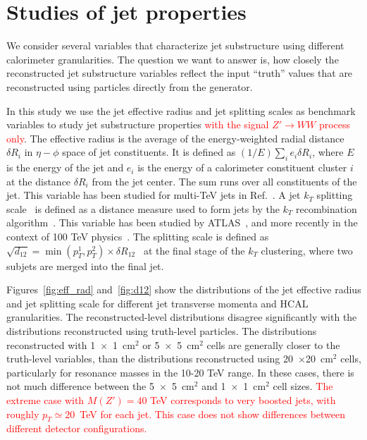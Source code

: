 \section{Studies of jet properties}
\label{sec:jets}

We consider several variables that characterize jet substructure using different calorimeter granularities. The question we want to answer is, how closely the reconstructed
jet substructure variables reflect the input ``truth'' values  that are reconstructed using particles directly from the \pythia generator.

In this study we use the jet effective radius and jet splitting scales as benchmark variables
to study jet substructure properties \textcolor{red}{with the signal $Z'\rightarrow WW$ process only}. 
The effective radius is the average of the energy-weighted radial distance $\delta R_i$ in $\eta-\phi$ space of jet constituents.
It is defined as $(1/E) \sum_i e_i \delta R_i$, where $E$ is the energy of the jet and $e_i$ is the energy of a calorimeter 
constituent cluster $i$ at the distance $\delta R_i$ from the jet center. The sum runs over all constituents of the jet. 
This variable has been studied for multi-TeV jets in Ref.~\cite{Auerbach:2014xua}.
A jet $k_T$ splitting scale~\cite{Butterworth:2002tt} is defined as a distance measure
used to form jets by the $k_T$ recombination
algorithm~\cite{Catani1993187,Ellis:1993tq}.
This variable has been studied by ATLAS~\cite{ATLAS:2012am}, and more recently in the context of 100 TeV physics~\cite{Auerbach:2014xua}.
The splitting scale is defined as $\sqrt{d_{12}}=\min(p_T^1,p_T^2) \times \delta R_{12}$~\cite{ATLAS:2012am} 
 at the final stage of the $k_T$ clustering, where two subjets are merged into the final jet.

Figures~\ref{fig:eff_rad} and~\ref{fig:d12} show the distributions of 
the jet effective radius and jet splitting scale for  different jet transverse momenta and HCAL granularities. 
The reconstructed-level distributions  disagree significantly with the distributions  
reconstructed using truth-level particles. The distributions reconstructed with 1~$\times$~1~cm$^2$ or 5~$\times$~5~cm$^2$ cells 
 are generally closer to the truth-level variables, than the distributions 
reconstructed using 20~$\times$20~cm$^2$ cells, particularly for resonance masses in the 10-20 TeV range. In these cases, there is not much  difference between the 
 5~$\times$~5~cm$^2$ and  1~$\times$~1~cm$^2$ cell sizes. \textcolor{red}{The extreme case with $M(Z')=40$ TeV corresponds to very boosted jets, 
with roughly $p_T \simeq 20$~TeV for each jet.  This case does not show 
differences between different detector configurations.}

